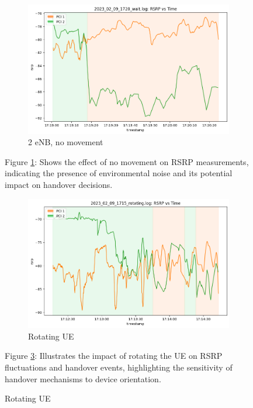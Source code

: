 \begin{figure}[p]
    \vspace{1cm}
    \begin{minipage}{0.45\textwidth}
    \begin{subfigure}{\linewidth}
        \centering
        \includegraphics[width=0.9\linewidth]{src//img/2024_02_09_wait.png}
        \caption{2 eNB, no movement}
        \label{fig:methods:2024-02-09-wait}
    \end{subfigure}
    \end{minipage}
    \begin{minipage}{0.45\textwidth}
        \small{Figure \ref{fig:methods:2024-02-09-wait}: Shows the effect of no movement on RSRP measurements, indicating the presence of environmental noise and its potential impact on handover decisions.}
    \end{minipage}
    
    \vspace{1cm}
    \begin{minipage}{0.45\textwidth}
    \begin{subfigure}{\linewidth}
        \centering
        \includegraphics[width=0.9\linewidth]{src//img/2024_02_09_rotating.png}
        \caption{Rotating UE}
        \label{fig:methods:2024-02-09-rotate}
    \end{subfigure}
    \end{minipage}
    \begin{minipage}{0.45\textwidth}
        \small{Figure \ref{fig:methods:2024-02-09-rotate}: Illustrates the impact of rotating the UE on RSRP fluctuations and handover events, highlighting the sensitivity of handover mechanisms to device orientation.}
    \end{minipage}
    

\end{figure}
